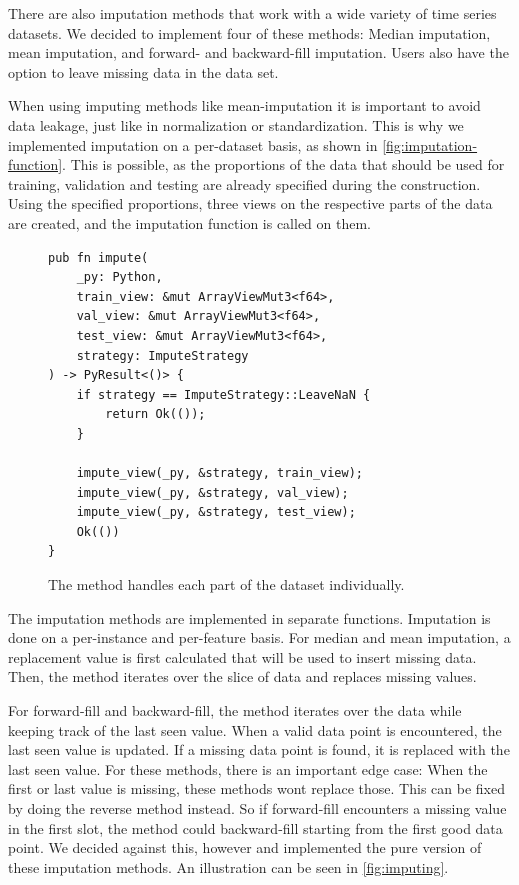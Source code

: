 \documentclass[review]{AIM_report}
\begin{document}
There are also imputation methods that work with a wide variety of time series datasets. We decided to implement four of these methods: Median imputation, mean imputation, and forward- and backward-fill imputation. Users also have the option to leave missing data in the data set.

When using imputing methods like mean-imputation it is important to avoid data leakage, just like in normalization or standardization. This is why we implemented imputation on a per-dataset basis, as shown in \autoref{fig:imputation-function}. This is possible, as the proportions of the data that should be used for training, validation and testing are already specified during the construction. Using the specified proportions, three views on the respective parts of the data are created, and the imputation function is called on them.
\begin{figure}[H]
    \begin{lstlisting}[style=rust]
pub fn impute(
    _py: Python,
    train_view: &mut ArrayViewMut3<f64>,
    val_view: &mut ArrayViewMut3<f64>,
    test_view: &mut ArrayViewMut3<f64>,
    strategy: ImputeStrategy
) -> PyResult<()> {
    if strategy == ImputeStrategy::LeaveNaN {
        return Ok(());
    }

    impute_view(_py, &strategy, train_view);
    impute_view(_py, &strategy, val_view);
    impute_view(_py, &strategy, test_view);
    Ok(())
}
    \end{lstlisting}
    \caption{The \impute method handles each part of the dataset individually.}
    \label{fig:imputation-function}
\end{figure}

The imputation methods are implemented in separate functions. Imputation is done on a per-instance and per-feature basis. For median and mean imputation, a replacement value is first calculated that will be used to insert missing data. Then, the method iterates over the slice of data and replaces missing values.

For forward-fill and backward-fill, the method iterates over the data while keeping track of the last seen value. When a valid data point is encountered, the last seen value is updated. If a missing data point is found, it is replaced with the last seen value. For these methods, there is an important edge case: When the first or last value is missing, these methods wont replace those. This can be fixed by doing the reverse method instead. So if forward-fill encounters a missing value in the first slot, the method could backward-fill starting from the first good data point. We decided against this, however and implemented the pure version of these imputation methods. An illustration can be seen in \autoref{fig:imputing}.
\end{document}
